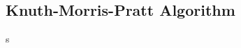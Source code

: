 


\subsection{Knuth-Morris-Pratt Algorithm}
 
\begin{java}[label={lst:knp}]
s
\end{java}

\endinput

